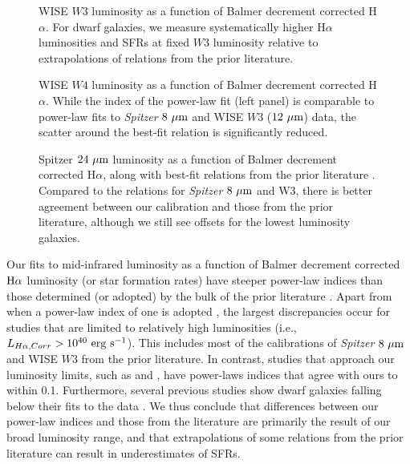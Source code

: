 \documentclass[preprint]{aastex61}
\begin{document}
\begin{figure*}
\caption{WISE $W3$ luminosity as a function of Balmer decrement corrected H$\alpha$.  For dwarf galaxies, we measure systematically higher H$\alpha$ luminosities and SFRs at fixed $W3$ luminosity relative to extrapolations of relations from the prior literature.}
\label{fig:w3cal}
\end{figure*}

\begin{figure*}
\caption{WISE $W4$ luminosity as a function of Balmer decrement corrected H$\alpha$. While the index of the power-law fit (left panel) is comparable to power-law fits to {\it Spitzer} $8~{\rm \mu m}$ and WISE $W3$ ($12~{\rm \mu m}$) data, the scatter around the best-fit relation is significantly reduced.}
\label{fig:w4cal}
\end{figure*}

\begin{figure*}
\caption{Spitzer $24~{\rm \mu m}$ luminosity as a function of Balmer decrement corrected H$\alpha$, along with best-fit relations from the prior literature \citep{wu05,rel07,zhu08,ken09}. Compared to the relations for {\it Spitzer} $8~{\rm \mu m}$ and W3, there is better agreement between our calibration and those from the prior literature, although we still see offsets for the lowest luminosity galaxies.}
\label{fig:24cal}
\end{figure*}


Our fits to mid-infrared luminosity as a function of Balmer decrement corrected ${\rm H\alpha}$ luminosity (or star formation rates) have steeper power-law indices than those determined (or adopted) by the bulk of the prior literature \citep[the exception being][]{cat15}. Apart from when a power-law index of one is adopted \citep[e.g.,][]{ken09, jar13}, the largest discrepancies occur for studies that are limited to relatively high luminosities (i.e., $L_{H\alpha,Corr}>10^{40}~{\rm erg~s^{-1}}$). This includes most of the calibrations of {\it Spitzer} $8~{\rm \mu m}$ and WISE $W3$ from the prior literature. In contrast, studies that approach our luminosity limits, such as \citet{rel07} and \citet{cat15}, have power-laws indices that agree with ours to within 0.1. Furthermore, several previous studies show dwarf galaxies falling below their fits to the data \citep[e.g.,][]{wu05,ken09}. We thus conclude that differences between our power-law indices and those from the literature are primarily the result of our broad luminosity range, and that extrapolations of some relations from the prior literature can result in underestimates of SFRs.
\end{document}
